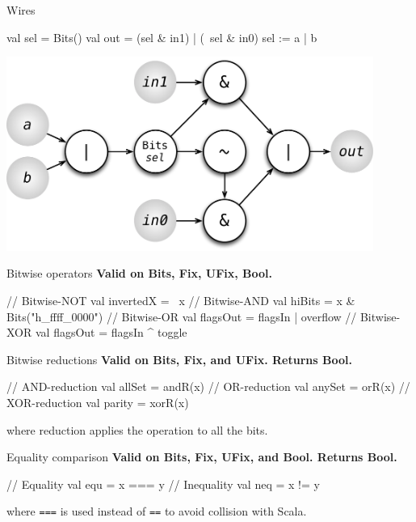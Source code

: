 \documentclass[xcolor=pdflatex,dvipsnames,table]{beamer}
\begin{document}
\begin{frame}[fragile]{Wires}

\begin{scala}
val sel = Bits()
val out = (sel & in1) | (~sel & in0)
sel := a | b
\end{scala}

\begin{center}
\includegraphics[width=0.9\textwidth]{figs/mux2-forward-sel.pdf} 
\end{center}

\end{frame}

\begin{frame}[fragile]{Bitwise operators}
\textbf{Valid on Bits, Fix, UFix, Bool.}
\begin{scala}
// Bitwise-NOT
val invertedX = ~x                      
// Bitwise-AND 
val hiBits    = x & Bits("h_ffff_0000") 
// Bitwise-OR
val flagsOut  = flagsIn | overflow      
// Bitwise-XOR
val flagsOut  = flagsIn ^ toggle        
\end{scala}
\end{frame}

\begin{frame}[fragile]{Bitwise reductions}
\textbf{Valid on Bits, Fix, and UFix.  Returns Bool.}
\begin{scala}
// AND-reduction 
val allSet = andR(x)  
// OR-reduction
val anySet = orR(x)   
// XOR-reduction 
val parity = xorR(x)  
\end{scala}
\noindent
where reduction applies the operation to all the bits.
\end{frame}

\begin{frame}[fragile]{Equality comparison}
\textbf{Valid on Bits, Fix, UFix, and Bool. Returns Bool.}
\begin{scala}
// Equality
val equ = x === y 
// Inequality 
val neq = x != y   
\end{scala}
\noindent
where \verb+===+ is used instead of \verb+==+ to avoid collision with Scala.
\end{frame}
\end{document}
